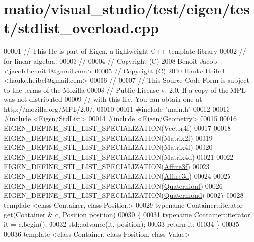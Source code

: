 \hypertarget{matio_2visual__studio_2test_2eigen_2test_2stdlist__overload_8cpp_source}{}\section{matio/visual\+\_\+studio/test/eigen/test/stdlist\+\_\+overload.cpp}
\label{matio_2visual__studio_2test_2eigen_2test_2stdlist__overload_8cpp_source}

\begin{DoxyCode}
00001 \textcolor{comment}{// This file is part of Eigen, a lightweight C++ template library}
00002 \textcolor{comment}{// for linear algebra.}
00003 \textcolor{comment}{//}
00004 \textcolor{comment}{// Copyright (C) 2008 Benoit Jacob <jacob.benoit.1@gmail.com>}
00005 \textcolor{comment}{// Copyright (C) 2010 Hauke Heibel <hauke.heibel@gmail.com>}
00006 \textcolor{comment}{//}
00007 \textcolor{comment}{// This Source Code Form is subject to the terms of the Mozilla}
00008 \textcolor{comment}{// Public License v. 2.0. If a copy of the MPL was not distributed}
00009 \textcolor{comment}{// with this file, You can obtain one at http://mozilla.org/MPL/2.0/.}
00010 
00011 \textcolor{preprocessor}{#include "main.h"}
00012 
00013 \textcolor{preprocessor}{#include <Eigen/StdList>}
00014 \textcolor{preprocessor}{#include <Eigen/Geometry>}
00015 
00016 EIGEN\_DEFINE\_STL\_LIST\_SPECIALIZATION(Vector4f)
00017 
00018 EIGEN\_DEFINE\_STL\_LIST\_SPECIALIZATION(Matrix2f)
00019 EIGEN\_DEFINE\_STL\_LIST\_SPECIALIZATION(Matrix4f)
00020 EIGEN\_DEFINE\_STL\_LIST\_SPECIALIZATION(Matrix4d)
00021 
00022 EIGEN\_DEFINE\_STL\_LIST\_SPECIALIZATION(\hyperlink{group___geometry___module_class_eigen_1_1_transform}{Affine3f})
00023 EIGEN\_DEFINE\_STL\_LIST\_SPECIALIZATION(\hyperlink{group___geometry___module_class_eigen_1_1_transform}{Affine3d})
00024 
00025 EIGEN\_DEFINE\_STL\_LIST\_SPECIALIZATION(\hyperlink{group___geometry___module_class_eigen_1_1_quaternion}{Quaternionf})
00026 EIGEN\_DEFINE\_STL\_LIST\_SPECIALIZATION(\hyperlink{group___geometry___module_class_eigen_1_1_quaternion}{Quaterniond})
00027 
00028 \textcolor{keyword}{template} <\textcolor{keyword}{class} Container, \textcolor{keyword}{class} Position>
00029 \textcolor{keyword}{typename} Container::iterator \textcolor{keyword}{get}(Container & c, Position position)
00030 \{
00031   \textcolor{keyword}{typename} Container::iterator it = c.begin();
00032   std::advance(it, position);
00033   \textcolor{keywordflow}{return} it;
00034 \}
00035 
00036 \textcolor{keyword}{template} <\textcolor{keyword}{class} Container, \textcolor{keyword}{class} Position, \textcolor{keyword}{class} Value>

\end{DoxyCode}
